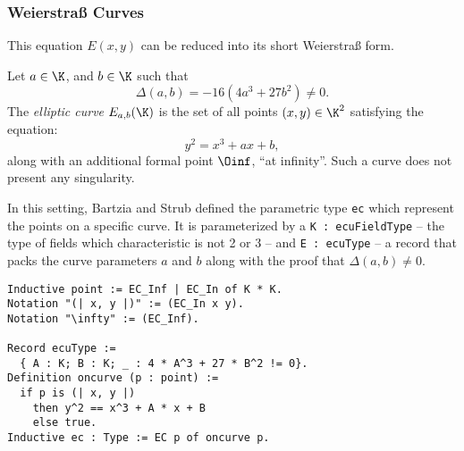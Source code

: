 \subsubsection{Weierstra{\ss} Curves}
\label{subsec:ECC-Weierstrass}

This equation $E(x,y)$ can be reduced into its short Weierstra{\ss} form.

\begin{dfn}
Let $a \in \K$, and $b \in \K$ such that $$\Delta(a,b) = -16(4a^3 + 27b^2) \neq 0.$$
The \textit{elliptic curve} $E_{a,b}(\K)$ is the set of all points $(x,y) \in \K^2$ satisfying the equation:
$$y^2 = x^3 + ax + b,$$
along with an additional formal point $\Oinf$, ``at infinity''. Such a curve does not present any singularity.
\end{dfn}

In this setting, Bartzia and Strub defined the parametric type \texttt{ec} which
represent the points on a specific curve. It is parameterized by
a \texttt{K : ecuFieldType} -- the type of fields which characteristic is not 2 or 3 --
and \texttt{E : ecuType} -- a record that packs the curve parameters $a$ and $b$
along with the proof that $\Delta(a,b) \neq 0$.
\begin{lstlisting}[language=Coq]
Inductive point := EC_Inf | EC_In of K * K.
Notation "(| x, y |)" := (EC_In x y).
Notation "\infty" := (EC_Inf).

Record ecuType :=
  { A : K; B : K; _ : 4 * A^3 + 27 * B^2 != 0}.
Definition oncurve (p : point) :=
  if p is (| x, y |)
    then y^2 == x^3 + A * x + B
    else true.
Inductive ec : Type := EC p of oncurve p.
\end{lstlisting}

